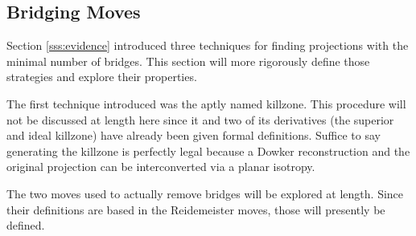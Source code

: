 \documentclass[titlepage]{article}
\begin{document}
\subsection{Bridging Moves}\label{sss:bridging}
Section \ref{sss:evidence} introduced three techniques for finding projections with the minimal number of bridges. This section will more rigorously define those strategies and explore their properties.\par
The first technique introduced was the aptly named killzone. This procedure will not be discussed at length here since it and two of its derivatives (the superior and ideal killzone) have already been given formal definitions. Suffice to say generating the killzone is perfectly legal because a Dowker reconstruction and the original projection can be interconverted via a planar isotropy.\par
The two moves used to actually remove bridges will be explored at length. Since their definitions are based in the Reidemeister moves, those will presently be defined.\par
\end{document}
